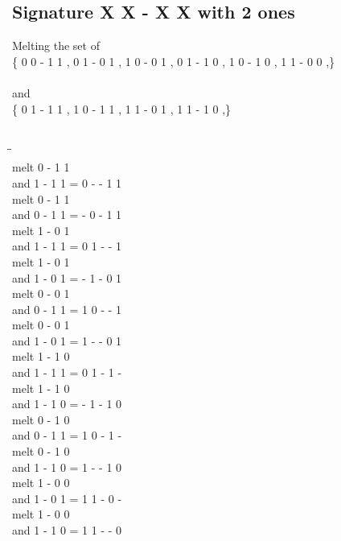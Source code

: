 \documentclass{article}
\begin{document}
\subsection{Signature X X - X X with 2 ones}
Melting the set of\\
\{ 0  0  -  1  1 , 0  1  -  0  1 , 1  0  -  0  1 , 0  1  -  1  0 , 1  0  -  1  0 , 1  1  -  0  0 ,\}\\\\
and\\
\{ 0  1  -  1  1 , 1  0  -  1  1 , 1  1  -  0  1 , 1  1  -  1  0 ,\}\\\\
\begin{tabbing}
\hspace{3cm}\=\hspace{3cm}\=\hspace{3cm}\\[1cm]
melt  0  -  1  1 \\
and  1  -  1  1 \>
 =  0  -  -  1  1 \\[1mm]
melt  0  -  1  1 \\
and  0  -  1  1 \>
 =  -  0  -  1  1 \\[1mm]
melt  1  -  0  1 \\
and  1  -  1  1 \>
 =  0  1  -  -  1 \\[1mm]
melt  1  -  0  1 \\
and  1  -  0  1 \>
 =  -  1  -  0  1 \\[1mm]
melt  0  -  0  1 \\
and  0  -  1  1 \>
 =  1  0  -  -  1 \\[1mm]
melt  0  -  0  1 \\
and  1  -  0  1 \>
 =  1  -  -  0  1 \\[1mm]
melt  1  -  1  0 \\
and  1  -  1  1 \>
 =  0  1  -  1  - \\[1mm]
melt  1  -  1  0 \\
and  1  -  1  0 \>
 =  -  1  -  1  0 \\[1mm]
melt  0  -  1  0 \\
and  0  -  1  1 \>
 =  1  0  -  1  - \\[1mm]
melt  0  -  1  0 \\
and  1  -  1  0 \>
 =  1  -  -  1  0 \\[1mm]
melt  1  -  0  0 \\
and  1  -  0  1 \>
 =  1  1  -  0  - \\[1mm]
melt  1  -  0  0 \\
and  1  -  1  0 \>
 =  1  1  -  -  0 \\[1mm]
\end{tabbing}
\newpage
\end{document}
